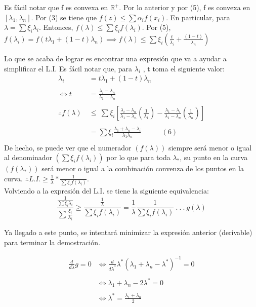 \documentclass[12pt]{article}
\begin{document}
\begin{enumerate}
	 \noindent Es f\'acil notar que f es convexa en $\mathbb{R}^{+}$. Por lo anterior y por (5), f es convexa en $\left[\lambda_1,\lambda_n\right]$. Por (3) se tiene que $f(z) \le \sum \alpha_i f(x_i)$. En particular, para $\lambda = \sum \xi_i \lambda_i$.
	\noindent Entonces, $f(\lambda) \le \sum \xi_i f(\lambda_i)$. Por (5), $f(\lambda_i) = f(t \lambda_1 + (1-t)\lambda_n) \implies f(\lambda)\le \sum \xi_i (\frac{t}{\lambda_i} + \frac{(1-t)}{\lambda_n})$
	
	\noindent Lo que se acaba de lograr es encontrar una expresi\'on que va a ayudar a simplificar el L.I. Es f\'acil notar que, para $\lambda_i$ , t toma el siguiente valor: \\
	\begin{align*}
	\lambda_i &= t \lambda_1 + (1-t)\lambda_n \\ \\
	\iff t &= \frac{\lambda_i - \lambda_n}{\lambda_1 - \lambda_n} \\ \\
	\therefore f(\lambda) \ &{\le} \  \sum\xi_i \left[\frac{\lambda_i - \lambda_n}{\lambda_1 - \lambda_n}(\frac{1}{\lambda_1}) - \frac{\lambda_1 - \lambda_i}{\lambda_1 - \lambda_n}(\frac{1}{\lambda_n})\right] \\ \\
	&= \sum \xi_i \frac{\lambda_1 + \lambda_n - \lambda_i}{\lambda_1 \lambda_n}  \ \ \ \ \ \ \ \ \ \ \ \ \ (6) \\
	\end{align*}
	\noindent De hecho, se puede ver que el numerador $( f(\lambda) )$ siempre ser\'a menor o igual al denominador $(\sum \xi_i f(\lambda_i))$ por lo que para toda $\lambda_*$, su punto en la curva $(f(\lambda_*))$ ser\'a menor o igual a la combinaci\'on convenza de los puntos en la curva. $\therefore L.I. \ge \frac{1}{\lambda} * \frac{1}{\sum \xi_i f(\lambda_i)}	$. \\ 
	\noindent Volviendo a la expresi\'on del L.I. se tiene la siguiente equivalencia: $$\frac{\frac{1}{\sum \xi_i \lambda_i}}{\sum \frac{\xi_i}{\lambda_i}}\ge \frac{\frac{1}{\lambda}}{\sum \xi_i f(\lambda_i)} = \frac{1}{\lambda}\frac{1}{\sum \xi_i f(\lambda_i)} \ . \ . \ . \ g(\lambda)$$
	
	\noindent Ya llegado a este punto, se intentar\'a minimizar la expresi\'on anterior (derivable) para terminar la demostraci\'on. 
	
	\begin{align*}
		\frac{d}{d\lambda} g = 0 &{\iff} \frac{d}{d\lambda^*} \lambda^*(\lambda_1 + \lambda_n -\lambda^*)^{-1} = 0 \\ \\
		&{\iff} \lambda_1 + \lambda_n -2\lambda^* = 0 \\ \\
		&{\iff} \lambda^* = \frac{\lambda_1 + \lambda_n}{2} 
	\end{align*}
	

\end{enumerate}
\end{document}

